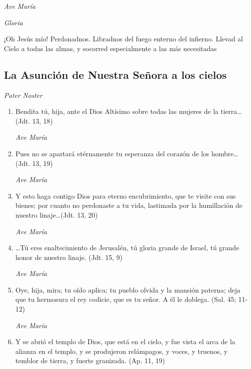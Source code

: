 \documentclass[a4paper,11pt, oneside]{report}
\begin{document}
        \textit{Ave María} \par
        \indent\textit{Gloria} \par
        \indent¡Oh Jesús mío! Perdonadnos. Libradnos del fuego enterno del infierno. Llevad al Cielo a todas las almas, y socorred especialmente a las más 
        necesitadas

      \subsection*{La Asunción de Nuestra Señora a los cielos}

        \textit{Pater Noster}

        \begin{enumerate}

          \item Bendita tú, hija, ante el Dios Altísimo sobre todas las mujeres de la tierra\ldots (Jdt. 13, 18)

          \textit{Ave María}

          \item Pues no se apartará etérnamente tu esperanza del corazón de los hombre\ldots (Jdt. 13, 19)

          \textit{Ave María}

          \item Y esto haga contigo Dios para eterno encubrimiento, que te visite con sus bienes; por cuanto no perdonaste
          a tu vida, lastimada por la humillación de nuestro linaje\ldots (Jdt. 13, 20)

          \textit{Ave María}

          \item {\ldots}Tú eres enaltecimiento de Jerusalén, tú gloria grande de Israel, tú grande honor de nuestro linaje. (Jdt. 15, 9)

          \textit{Ave María}

          \item Oye, hija, mira; tu oído aplica; tu pueblo olvida y la mansión paterna; deja que tu hermosura
          el rey codicie, que es tu señor. A él le doblega. (Sal. 45; 11-12)

          \textit{Ave María}

          \item Y se abrió el templo de Dios, que está en el cielo, y fue vista el arca de la alianza en el templo,
          y se produjeron relámpagos, y voces, y truenos, y temblor de tierra, y fuerte granizada. (Ap. 11, 19)


\end{enumerate}
\end{document}
